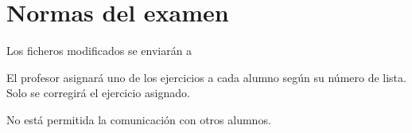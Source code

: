 
\usepackage{eurosym}


\renewcommand{\hmwkClass}{Automatización de tareas}
\renewcommand{\hmwkTitle}{Examen de \textit{scripts} de \textit{shell}}


\usepackage{blindtext}








\primerapagina

\setlength{\parindent}{0em}
\setlength{\parskip}{1em}

\section{Normas del examen}
Los ficheros modificados se enviarán a 

El profesor asignará uno de los ejercicios a cada alumno según su número de lista. Solo se corregirá el ejercicio asignado.

No está permitida la comunicación con otros alumnos.


